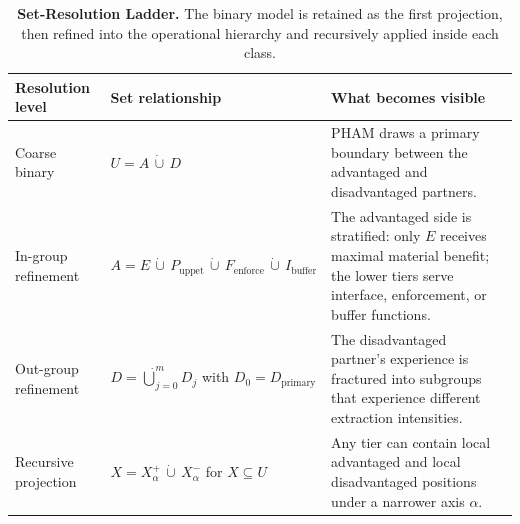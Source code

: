 \documentclass[12pt,openany]{book}
\numberwithin{equation}{chapter}
\begin{document}
\begin{table}[htbp]
\centering
\small
\renewcommand{\arraystretch}{1.25}
\begin{tabularx}{\textwidth}{>{\raggedright\arraybackslash}p{}
>{\raggedright\arraybackslash}p{}
>{\raggedright\arraybackslash}X}
\toprule
\textbf{Resolution level} & \textbf{Set relationship} & \textbf{What becomes visible} \\
\midrule
Coarse binary & $U = A \,\dot\cup\, D$ & PHAM draws a primary boundary between the advantaged and disadvantaged partners. \\
In-group refinement & $A = E \,\dot\cup\, P_{\text{uppet}} \,\dot\cup\, F_{\text{enforce}} \,\dot\cup\, I_{\text{buffer}}$ & The advantaged side is stratified: only $E$ receives maximal material benefit; the lower tiers serve interface, enforcement, or buffer functions. \\
Out-group refinement & $D = \dot\bigcup_{j=0}^{m} D_j$ with $D_0 = D_{\text{primary}}$ & The disadvantaged partner's experience is fractured into subgroups that experience different extraction intensities. \\
Recursive projection & $X = X^{+}_{\alpha} \,\dot\cup\, X^{-}_{\alpha}$ for $X \subseteq U$ & Any tier can contain local advantaged and local disadvantaged positions under a narrower axis $\alpha$. \\
\bottomrule
\end{tabularx}
\caption{\textbf{Set-Resolution Ladder.} The binary model is retained as the first projection, then refined into the operational hierarchy and recursively applied inside each class.}
\label{tab:set-resolution-ladder}
\end{table}
\end{document}
